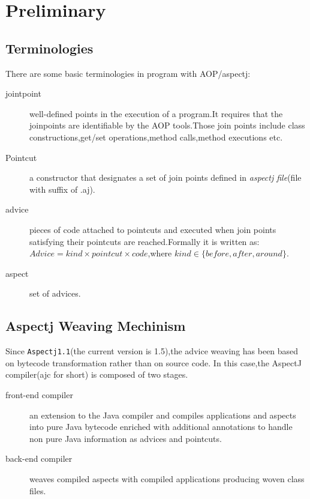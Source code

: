 \section{Preliminary}

\subsection{Terminologies}
There are some basic terminologies in program with AOP/aspectj:
\begin{description}
\item[jointpoint] well-defined points in the execution of a program.It requires that the joinpoints are identifiable by the AOP tools.Those join points include class constructions,get/set operations,method calls,method executions etc.
\item[Pointcut] a constructor that designates a set of join points defined in \emph{aspectj file}(file with suffix of .aj).
\item[advice] pieces of code attached to pointcuts and executed when join points satisfying their pointcuts are reached.Formally it is written as:$Advice=kind\times pointcut\times code$,where $kind\in\{before,after,around\}$.
\item[aspect] set of advices.
\end{description}

\subsection{Aspectj Weaving Mechinism}
Since \texttt{Aspectj1.1}(the current version is 1.5),the advice weaving has been based on bytecode transformation rather than on source code. In this case,the AspectJ compiler(ajc for short) is composed of two stages.
\begin{description}
\item[front-end compiler] an extension to the Java compiler and compiles applications and aspects into pure Java bytecode enriched with additional annotations to handle non pure Java information as advices and pointcuts.
\item[back-end compiler] weaves compiled aspects with compiled applications producing woven class files.
\end{description}

